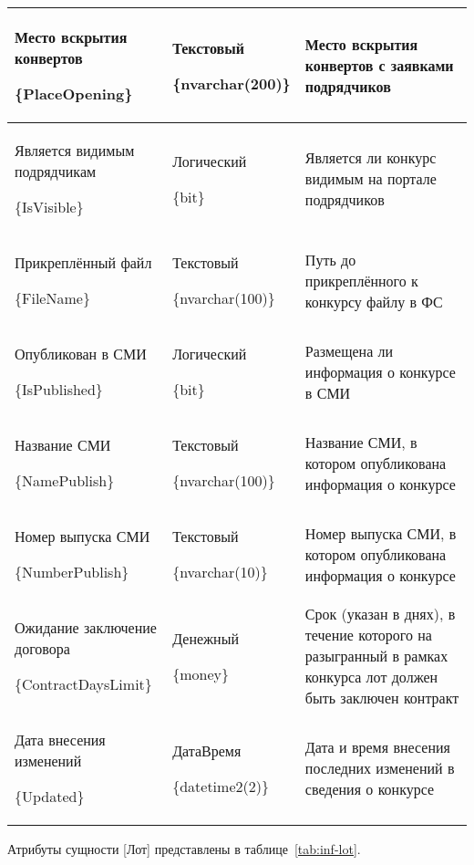 \begin{footnotesize}
\begin{longtable}[h]{|p{}|p{}|p{}|}
	Место вскрытия конвертов \par \{PlaceOpening\} & Текстовый \par \{nvarchar(200)\} & Место вскрытия конвертов с заявками подрядчиков \\ \hline
	Является видимым подрядчикам \par \{IsVisible\} & Логический \par \{bit\} & Является ли конкурс видимым на портале подрядчиков \\ \hline
	Прикреплённый файл \par \{FileName\} & Текстовый \par \{nvarchar(100)\} & Путь до прикреплённого к конкурсу файлу в ФС \\ \hline
	Опубликован в СМИ \par \{IsPublished\} & Логический \par \{bit\} & Размещена ли информация о конкурсе в СМИ \\ \hline
	Название СМИ \par \{NamePublish\} & Текстовый \par \{nvarchar(100)\} & Название СМИ, в котором опубликована информация о конкурсе \\ \hline
	Номер выпуска СМИ \par \{NumberPublish\} & Текстовый \par \{nvarchar(10)\} & Номер выпуска СМИ, в котором опубликована информация о конкурсе \\ \hline
	Ожидание заключение договора \par \{ContractDaysLimit\} & Денежный \par \{money\} & Срок (указан в днях), в течение которого на разыгранный в рамках конкурса лот должен быть заключен контракт \\ \hline
	Дата внесения изменений \par \{Updated\} & ДатаВремя \par \{datetime2(2)\} & Дата и время внесения последних изменений в сведения о конкурсе \\ \hline
\end{longtable}
\end{footnotesize}

Атрибуты сущности [Лот] представлены в таблице~\ref{tab:inf-lot}.

